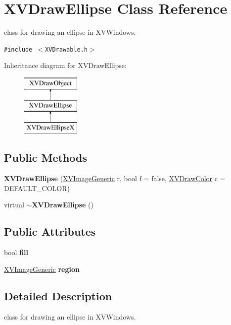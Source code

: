 \hypertarget{class_XVDrawEllipse}{
\section{XVDraw\-Ellipse  Class Reference}
\label{XVDrawEllipse}
}
class for drawing an ellipse in XVWindows. 


{\tt \#include $<$XVDrawable.h$>$}

Inheritance diagram for XVDraw\-Ellipse:\begin{figure}[H]
\begin{center}
\leavevmode
\includegraphics[height=3cm]{class_XVDrawEllipse}
\end{center}
\end{figure}
\subsection*{Public Methods}
\begin{CompactItemize}
\item 
{\bf XVDraw\-Ellipse} (\hyperlink{class_XVImageGeneric}{XVImage\-Generic} r, bool f = false, \hyperlink{class_XVDrawColor}{XVDraw\-Color} c = DEFAULT\_\-COLOR)
\item 
virtual {\bf $\sim$XVDraw\-Ellipse} ()
\end{CompactItemize}
\subsection*{Public Attributes}
\begin{CompactItemize}
\item 
bool {\bf fill}
\item 
\hyperlink{class_XVImageGeneric}{XVImage\-Generic} {\bf region}
\end{CompactItemize}


\subsection{Detailed Description}
class for drawing an ellipse in XVWindows.





